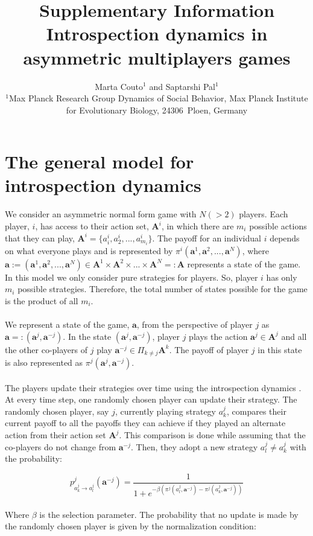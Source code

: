 \documentclass[11pt]{article}
\title{\sffamily \Large Supplementary Information\\[0.1cm] {\bfseries Introspection dynamics in asymmetric multiplayers games}}
\date{\empty}
\author{\parbox[c]{16cm}{\centering \onehalfspacing \fontsize{11}{12}\selectfont Marta Couto$^1$ and Saptarshi Pal$^1$\\[0.2cm]
$^1$Max Planck Research Group Dynamics of Social Behavior, Max Planck Institute for Evolutionary Biology, 24306~Ploen, Germany}}
\theoremstyle{plainCl1}
\theoremstyle{plainCl2}
\newcommand{\A}{\mathbf{A}}
\newcommand{\abf}{\mathbf{a}}
\begin{document}
\maketitle
\onehalfspacing
\section*{The general model for introspection dynamics}
We consider an asymmetric normal form game with $N (>2)$ players. Each player, $i$, has access to their action set, $\A^i$, in which there are $m_i$ possible actions that they can play, $\A^i = \{a^i_i, a^i_2, ..., a^i_{m_i}\}$. The payoff for an individual $i$ depends on what everyone plays and is represented by $\pi^i(\abf^1, \abf^2, ..., \abf^N)$, where $\abf := (\abf^1, \abf^2,...,\abf^N) \in \A^1 \times \A^2 \times ... \times \A^N =: \A$ represents a state of the game. In this model we only consider pure strategies for players. So, player $i$ has only $m_i$ possible strategies. Therefore, the total number of states possible for the game is the product of all $m_i$. 
\\ \\
\noindent We represent a state of the game, $\abf$, from the perspective of player $j$ as $\abf =: (\abf^j, \abf^{-j})$. In the state $(\abf^j, \abf^{-j})$, player $j$ plays the action $\abf^j \in \A^j$ and all the other co-players of $j$ play $\abf^{-j} \in \Pi_{k \neq j} \A^k$. The payoff of player $j$ in this state is also represented as $\pi^j(\abf^j, \abf^{-j})$.
\\ \\
\noindent The players update their strategies over time using the introspection dynamics \cite{couto2022introspection}. At every time step, one randomly chosen player can update their strategy. The randomly chosen player, say $j$, currently playing strategy $a^j_k$, compares their current payoff to all the payoffs they can achieve if they played an alternate action from their action set $\A^j$. This comparison is done while assuming that the co-players do not change from $\abf^{-j}$. Then, they adopt a new strategy $a^j_l \neq a^j_k$ with the probability: 

\begin{equation}
 p^j_{a^j_k \to a^j_l} (\abf^{-j})= \frac{1}{1 + e^{\displaystyle -\beta(\pi^j(a^j_l, \abf^{-j}) - \pi^j(a^j_k, \abf^{-j}))}}
 \label{Eq:introspection-update}
\end{equation}
\\
\noindent Where $\beta$ is the selection parameter. The probability that no update is made by the randomly chosen player is given by the normalization condition: 
\end{document}
